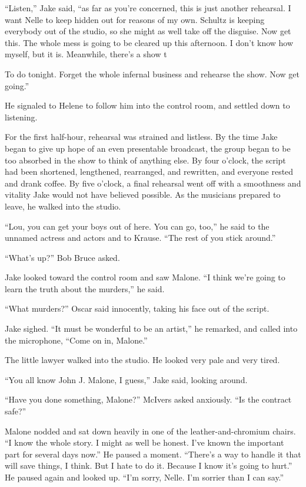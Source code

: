 \documentclass{novel}
\begin{document}
“Listen,” Jake said, “as far as you’re concerned, this is just another rehearsal. I want Nelle to keep hidden out for reasons of my own. Schultz is keeping everybody out of the studio, so she might as well take off the disguise. Now get this. The whole mess is going to be cleared up this afternoon. I don’t know how myself, but it is. Meanwhile, there’s a show t

To do tonight. Forget the whole infernal business and rehearse the show. Now get going.”

He signaled to Helene to follow him into the control room, and settled down to listening.

For the first half-hour, rehearsal was strained and listless. By the time Jake began to give up hope of an even presentable broadcast, the group began to be too absorbed in the show to think of anything else. By four o’clock, the script had been shortened, lengthened, rearranged, and rewritten, and everyone rested and drank coffee. By five o’clock, a final rehearsal went off with a smoothness and vitality Jake would not have believed possible. As the musicians prepared to leave, he walked into the studio.

“Lou, you can get your boys out of here. You can go, too,” he said to the unnamed actress and actors and to Krause. “The rest of you stick around.”

“What’s up?” Bob Bruce asked.

Jake looked toward the control room and saw Malone. “I think we’re going to learn the truth about the murders,” he said.

“What murders?” Oscar said innocently, taking his face out of the script.

Jake sighed. “It must be wonderful to be an artist,” he remarked, and called into the microphone, “Come on in, Malone.”

The little lawyer walked into the studio. He looked very pale and very tired.

“You all know John J. Malone, I guess,” Jake said, looking around.

“Have you done something, Malone?” McIvers asked anxiously. “Is the contract safe?”

Malone nodded and sat down heavily in one of the leather-and-chromium chairs. “I know the whole story. I might as well be honest. I've known the important part for several days now.” He paused a moment. “There’s a way to handle it that will save things, I think. But I hate to do it. Because I know it’s going to hurt.” He paused again and looked up. “I’m sorry, Nelle. I’m sorrier than I can say.”
\end{document}
